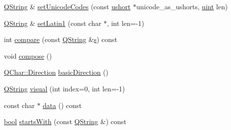 \begin{DoxyCompactItemize}
\item 
\hyperlink{class_q_string}{Q\+String} \& \hyperlink{class_q_string_a0c39790333795768528b58602afb36b9}{set\+Unicode\+Codes} (const \hyperlink{qglobal_8h_ab95f123a6c9bcfee6a343170ef8c5f69}{ushort} $\ast$unicode\+\_\+as\+\_\+ushorts, \hyperlink{qglobal_8h_a4d3943ddea65db7163a58e6c7e8df95a}{uint} len)
\item 
\hyperlink{class_q_string}{Q\+String} \& \hyperlink{class_q_string_ab7df9df250d260fd19067f9c921c0047}{set\+Latin1} (const char $\ast$, int len=-\/1)
\item 
int \hyperlink{class_q_string_a96fd1fd6dcf608ee3d64e116720c0fa5}{compare} (const \hyperlink{class_q_string}{Q\+String} \&\hyperlink{060__command__switch_8tcl_a011c73f2dbb87635a3b4206c72355f6e}{s}) const 
\item 
void \hyperlink{class_q_string_a1b04937a2233337016aafaa546ef83a9}{compose} ()
\item 
\hyperlink{class_q_char_a54978126be7630b3e85394325a822302}{Q\+Char\+::\+Direction} \hyperlink{class_q_string_a485e0f189e04c792a8e557832ec28541}{basic\+Direction} ()
\item 
\hyperlink{class_q_string}{Q\+String} \hyperlink{class_q_string_aaadfa2ae50754aa87fed66d04b4f8e2b}{visual} (int index=0, int len=-\/1)
\item 
const char $\ast$ \hyperlink{class_q_string_a382f147bd56024111e9b7a43feebe1cd}{data} () const 
\item 
\hyperlink{qglobal_8h_a1062901a7428fdd9c7f180f5e01ea056}{bool} \hyperlink{class_q_string_aa8450cf245fd5090da50c407ede7975e}{starts\+With} (const \hyperlink{class_q_string}{Q\+String} \&) const 
\end{DoxyCompactItemize}
